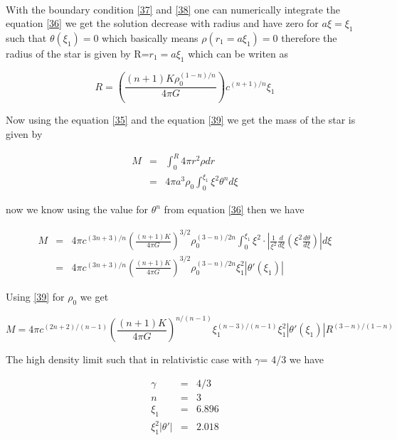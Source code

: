 \documentclass{report}
\begin{document}
\paragraph{ }
With the boundary condition \ref{37} and \ref{38} one can numerically  integrate the equation \ref{36} we get the solution decrease with radius and have zero for $a\xi = \xi_1$ such that $\theta(\xi_1)  =0$ which basically means $\rho(r_1 = a\xi_1)=0$ therefore the radius of the star is given by R=$r_1=a\xi_1$ which can be writen as 
\begin{center}
\begin{equation}
R=\left( \frac{(n+1)K\rho_0 ^{(1-n)/n}}{4\pi G} \right) c^{(n+1)/n}\xi_1
\label{39}
\end{equation}
\end{center}
Now using the equation \ref{35} and the equation \ref{39} we get the mass of the star is given by
\begin{center}
\begin{eqnarray}
M &=& \int_0 ^R 4\pi r^2 \rho dr \nonumber \\
	&=& 4\pi a^3 \rho_0 \int_0 ^{\xi_1} \xi ^2 \theta ^n d\xi \nonumber   
\end{eqnarray}
\end{center}
now we know using the value for $\theta^n$ from equation \ref{36} then we have 
\begin{center}
\begin{eqnarray}
M &=& 4\pi c^{(3n+3)/n} \left( \frac{ (n+1)K}{4\pi G} \right)^{3/2} \rho_0 ^{(3-n)/2n} \int_0 ^{\xi_1} \xi^2 \cdot |\frac{1}{\xi^2} \frac{d}{d\xi} \left( \xi^2 \frac{d\theta}{d\xi}\right) | d\xi \nonumber \\
	&=& 4\pi c^{(3n+3)/n} \left( \frac{ (n+1)K}{4\pi G} \right)^{3/2} \rho_0 ^{(3-n)/2n} \xi_1 ^2|\theta{'}(\xi_1)| 
\label{40}
\end{eqnarray}
\end{center}
Using \ref{39} for $\rho_0$ we get 
\begin{center}
\begin{equation}
M = 4\pi c^{(2n+2)/(n-1)} \left( \frac{ (n+1)K}{4\pi G} \right)^{n/(n-1)} \xi_1 ^{(n-3)/(n-1)} \xi_1 ^2|\theta{'}(\xi_1)| R^{(3-n)/(1-n)}
\label{41}
\end{equation}
\end{center}
The high density limit such that in relativistic case with $\gamma$= 4/3 we have 
\begin{center}
\begin{eqnarray}
\gamma &=& 4/3 \nonumber  \\
n &=& 3 \nonumber \\
\xi_1 &=& 6.896 \nonumber \\
\xi_1 ^2 |\theta{'}| &=&  2.018
\end{eqnarray}
\end{center}
\newpage
\end{document}
